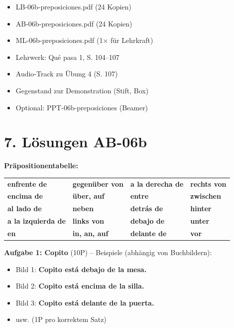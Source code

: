 \documentclass[11pt, a4paper]{article}
\newcommand{\fachfarbe}{spanisch}
\newcommand{\sequenz}{06}
\newcommand{\block}{b}
\newcommand{\lerngruppengroesse}{24}
\newcommand{\lsg}[1]{\textcolor{loesung}{\textbf{#1}}}
\newcommand{\es}[1]{\textcolor{\fachfarbe}{\textbf{#1}}}
\begin{document}
\begin{materialbox}
\begin{itemize}[label=$\square$]
    \item LB-06b-preposiciones.pdf (\lerngruppengroesse{} Kopien)
    \item AB-06b-preposiciones.pdf (\lerngruppengroesse{} Kopien)
    \item ML-06b-preposiciones.pdf (1× für Lehrkraft)
    \item Lehrwerk: Qué pasa 1, S. 104--107
    \item Audio-Track zu Übung 4 (S. 107)
    \item Gegenstand zur Demonstration (Stift, Box)
    \item Optional: PPT-06b-preposiciones (Beamer)
\end{itemize}
\end{materialbox}


\section*{7. Lösungen AB-\sequenz\block}

\textbf{Präpositionentabelle:}

\begin{tabular}{ll|ll}
\es{enfrente de} & \lsg{gegenüber von} & \es{a la derecha de} & \lsg{rechts von} \\
\es{encima de} & \lsg{über, auf} & \es{entre} & \lsg{zwischen} \\
\es{al lado de} & \lsg{neben} & \es{detrás de} & \lsg{hinter} \\
\es{a la izquierda de} & \lsg{links von} & \es{debajo de} & \lsg{unter} \\
\es{en} & \lsg{in, an, auf} & \es{delante de} & \lsg{vor} \\
\end{tabular}

\vspace{1em}

\textbf{Aufgabe 1: Copito} (10P) -- Beispiele (abhängig von Buchbildern):
\begin{itemize}
    \item Bild 1: \lsg{Copito está debajo de la mesa.}
    \item Bild 2: \lsg{Copito está encima de la silla.}
    \item Bild 3: \lsg{Copito está delante de la puerta.}
    \item usw. (1P pro korrektem Satz)
\end{itemize}
\end{document}
